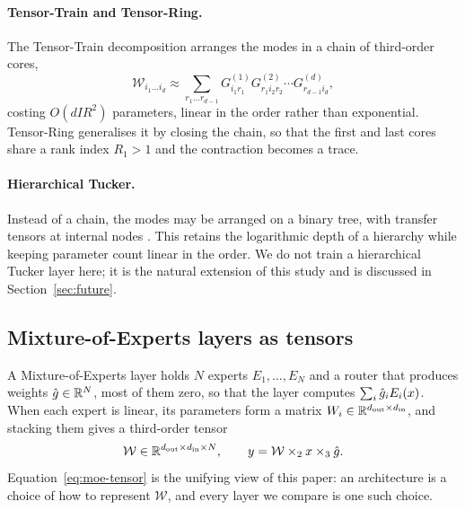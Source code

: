 \paragraph{Tensor-Train and Tensor-Ring.} The Tensor-Train decomposition
\citep{oseledets2011tt} arranges the modes in a chain of third-order cores,
\begin{equation}
  \mathcal{W}_{i_1 \ldots i_d} \approx
  \sum_{r_1 \ldots r_{d-1}}
  G^{(1)}_{i_1 r_1} G^{(2)}_{r_1 i_2 r_2} \cdots G^{(d)}_{r_{d-1} i_d},
\end{equation}
costing $O(d I R^2)$ parameters, linear in the order rather than exponential.
Tensor-Ring generalises it by closing the chain, so that the first and last
cores share a rank index $R_1 > 1$ and the contraction becomes a trace.

\paragraph{Hierarchical Tucker.} Instead of a chain, the modes may be arranged
on a binary tree, with transfer tensors at internal nodes
\citep{grasedyck2010hierarchical}. This retains the logarithmic depth of a
hierarchy while keeping parameter count linear in the order. We do not train a
hierarchical Tucker layer here; it is the natural extension of this study and
is discussed in Section~\ref{sec:future}.

\subsection{Mixture-of-Experts layers as tensors}

A Mixture-of-Experts layer holds $N$ experts $E_1, \ldots, E_N$ and a router
that produces weights $\hat{g} \in \mathbb{R}^N$, most of them zero, so that the layer
computes $\sum_{i} \hat{g}_i E_i(x)$. When each expert is linear, its parameters
form a matrix $W_i \in \mathbb{R}^{d_{\mathrm{out}} \times d_{\mathrm{in}}}$, and
stacking them gives a third-order tensor
\begin{equation}
  \mathcal{W} \in \mathbb{R}^{d_{\mathrm{out}} \times d_{\mathrm{in}} \times N},
  \qquad
  y = \mathcal{W} \times_2 x \times_3 \hat{g} .
  \label{eq:moe-tensor}
\end{equation}
Equation~\eqref{eq:moe-tensor} is the unifying view of this paper: an
architecture is a choice of how to represent $\mathcal{W}$, and every layer we
compare is one such choice.

